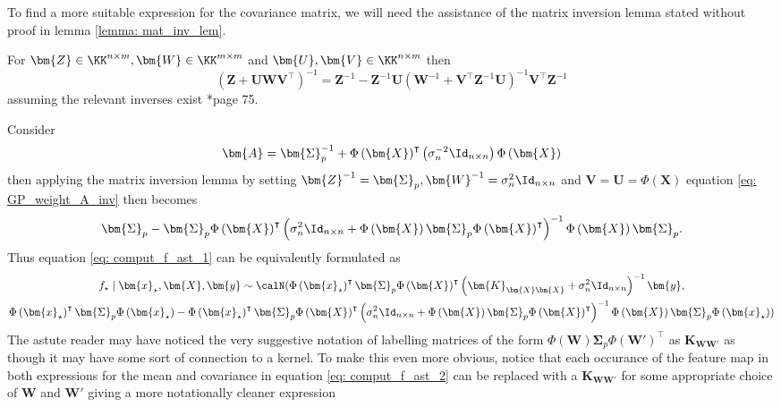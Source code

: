 To find a more suitable expression for the covariance matrix, we will need the assistance of the matrix inversion lemma stated without proof in lemma \ref{lemma: mat_inv_lem}.
\begin{lem} \label{lemma: mat_inv_lem}
    For $\bm{Z} \in \KK^{n \times m}, \bm{W} \in \KK^{m \times m}$ and $\bm{U},\bm{V} \in \KK^{n \times m}$ then
    \[
        \left( \bm{Z} + \bm{U} \bm{W} \bm{V}^{\intercal} \right)^{-1} = \bm{Z}^{-1} - \bm{Z}^{-1} \bm{U} \left( \bm{W}^{-1} + \bm{V}^{\intercal} \bm{Z}^{-1} \bm{U} \right)^{-1} \bm{V}^{\intercal} \bm{Z}^{-1}
    \]
    assuming the relevant inverses exist \cite{PressWilliamH.WilliamHenry1992NriC}*{page 75}.
\end{lem}
Consider
\begin{equation} \label{eq: GP_weight_A_inv}
    \bm{A} = \bm{\Sigma}_p^{-1} +  {\Phi \left( \bm{X} \right)}^{\intercal} \left( \sigma_n^{-2} \Id_{n \times n} \right) \Phi \left( \bm{X} \right)
\end{equation}
then applying the matrix inversion lemma by setting $\bm{Z}^{-1} = \bm{\Sigma}_p, \bm{W}^{-1} = \sigma_n^{2} \Id_{n \times n}$ and $\bm{V} = \bm{U} = \Phi \left( \bm{X} \right)$ equation \ref{eq: GP_weight_A_inv} then becomes
\begin{equation*}
    \bm{\Sigma}_p - \bm{\Sigma}_p {\Phi \left( \bm{X} \right)}^{\intercal} \left( \sigma_n^{2} \Id_{n \times n} + \Phi \left( \bm{X} \right) \bm{\Sigma}_p {\Phi \left( \bm{X} \right)}^{\intercal} \right)^{-1} \Phi \left( \bm{X} \right) \bm{\Sigma}_p.
\end{equation*}
Thus equation \ref{eq: comput_f_ast_1} can be equivalently formulated as
\begin{multline} \label{eq: comput_f_ast_2}
    f_{\star} \mid \bm{x}_{\star} , \bm{X} , \bm{y} \sim \calN ( \Phi \left( \bm{x}_{\star} \right)^{\intercal} \bm{\Sigma}_p {\Phi \left( \bm{X} \right)}^{\intercal} \left( \bm{K}_{\bm{X} \bm{X}} + \sigma_n^{2} \Id_{n \times n} \right)^{-1} \bm{y} , \\
    \Phi \left( \bm{x}_{\star} \right)^{\intercal} \bm{\Sigma}_p \Phi \left( \bm{x}_{\star} \right) - \Phi \left( \bm{x}_{\star} \right)^{\intercal} \bm{\Sigma}_p {\Phi \left( \bm{X} \right)}^{\intercal} \left( \sigma_n^{2} \Id_{n \times n} + \Phi \left( \bm{X} \right) \bm{\Sigma}_p {\Phi \left( \bm{X} \right)}^{\intercal} \right)^{-1} \Phi \left( \bm{X} \right) \bm{\Sigma}_p \Phi \left( \bm{x}_{\star} \right) )
\end{multline}
The astute reader may have noticed the very suggestive notation of labelling matrices of the form $\Phi \left( \bm{W} \right) \bm{\Sigma}_p {\Phi \left( \bm{W}' \right)}^{\intercal}$ as $\bm{K}_{\bm{W} \bm{W}'}$ as though it may have some sort of connection to a kernel. To make this even more obvious, notice that each occurance of the feature map in both expressions for the mean and covariance in equation \ref{eq: comput_f_ast_2} can be replaced with a $\bm{K}_{\bm{W} \bm{W}'}$ for some appropriate choice of $\bm{W}$ and $\bm{W}'$ giving a more notationally cleaner expression
